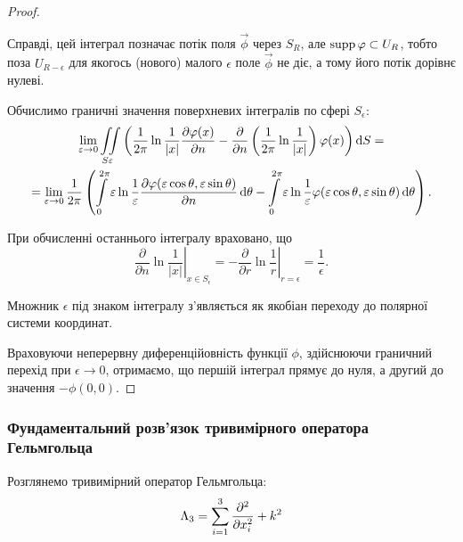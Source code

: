 \begin{proof}
	\begin{remark}
		Справді, цей інтеграл позначає потік поля $\vec \phi$ через $S_R$, але $\operatorname{supp} \varphi \subset U_R$, тобто поза $U_{R - \epsilon}$ для якогось (нового) малого $\epsilon$ поле $\vec \phi$ не діє, а тому його потік дорівнє нулеві.
	\end{remark}

	Обчислимо граничні значення поверхневих інтегралів по сфері $S_\epsilon$:
	\begin{multline}
		\displaystyle\lim\limits_{\varepsilon \to 0} \displaystyle\iint\limits_{S \varepsilon} \left( \frac{1}{2 \pi} \ln \frac{1}{|x|} \frac{\partial \varphi(x)}{\partial n} - \frac{\partial}{\partial n} \left( \frac{1}{2 \pi} \ln \frac{1}{|x|} \right) \varphi(x) \right) \mathop{}\!\mathrm{d} S = \\
		= \displaystyle\lim\limits_{\varepsilon \to 0} \frac{1}{2 \pi} \left( \displaystyle\int\limits_0^{2 \pi} \varepsilon \ln \frac{1}{\varepsilon} \frac{\partial \varphi(\varepsilon \cos \theta, \varepsilon \sin \theta)}{\partial n} \mathop{}\!\mathrm{d} \theta - \displaystyle\int\limits_0^{2 \pi} \varepsilon \ln \frac{1}{\varepsilon} \varphi(\varepsilon \cos \theta, \varepsilon \sin \theta) \mathop{}\!\mathrm{d} \theta \right).
	\end{multline}

	\begin{remark}
		При обчисленні останнього інтегралу враховано, що
		\begin{equation}
			\left. \frac{\partial}{\partial n} \ln \frac{1}{|x|} \right|_{x \in S_\epsilon} = - \left. \frac{\partial}{\partial r} \ln \frac{1}{r} \right|_{r = \epsilon} = \frac{1}{\epsilon}.
		\end{equation}

		Множник $\epsilon$ під знаком інтегралу з'являється як якобіан переходу до полярної системи координат.
	\end{remark}

	Враховуючи неперервну диференційовність функції $\phi$, здійснюючи граничний перехід при $\epsilon \to 0$, отримаємо, що першій інтеграл прямує до нуля, а другий до значення $- \phi(0, 0)$.
\end{proof}

\subsubsection{Фундаментальний розв'язок тривимірного оператора Гельмгольца}
 
Розглянемо тривимірний оператор Гельмгольца:
\begin{equation}
	\Lambda_3 = \displaystyle\sum\limits_{i = 1}^3 \frac{\partial^2}{\partial x_i^2} + k^2
\end{equation}

